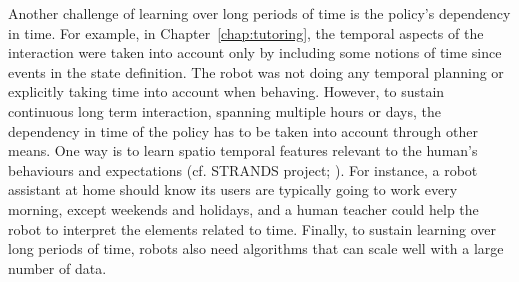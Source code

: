 Another challenge of learning over long periods of time is the policy's dependency in time. For example, in Chapter~\ref{chap:tutoring}, the temporal aspects of the interaction were taken into account only by including some notions of time since events in the state definition. The robot was not doing any temporal planning or explicitly taking time into account when behaving. However, to sustain continuous long term interaction, spanning multiple hours or days, the dependency in time of the policy has to be taken into account through other means. One way is to learn spatio temporal features relevant to the human's behaviours and expectations (cf. STRANDS project; \citealt{hawes2017strands}). For instance, a robot assistant at home should know its users are typically going to work every morning, except weekends and holidays, and a human teacher could help the robot to interpret the elements related to time. Finally, to sustain learning over long periods of time, robots also need algorithms that can scale well with a large number of data. 


